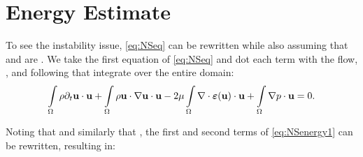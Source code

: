  \section{Energy Estimate}
 To see the instability issue, \autoref{eq:NSeq} can be rewritten while also assuming that \mathm{\phi} and \mathm{\psi} are . We take the first equation of \eqref{eq:NSeq} and dot each term with the flow, \bmu, and following that integrate over the entire domain:
 \begin{equation}\label{eq:NSenergy1}
     \int\limits_{\Omega}\rho\partial_t{\textbf{u}} \cdot {\textbf{u}} + \int\limits_{\Omega}\rho{\textbf{u}}\cdot\nabla{\textbf{u}} \cdot {\textbf{u}} - 2\mu\int\limits_{\Omega}\nabla\cdot\bm{\varepsilon}({\textbf{u}}) \cdot {\textbf{u}} + \int\limits_{\Omega}\nabla p \cdot {\textbf{u}} = 0.
 \end{equation}
 
 \noindent Noting that  and similarly that , the first and second terms of \eqref{eq:NSenergy1} can be rewritten, resulting in:
 
